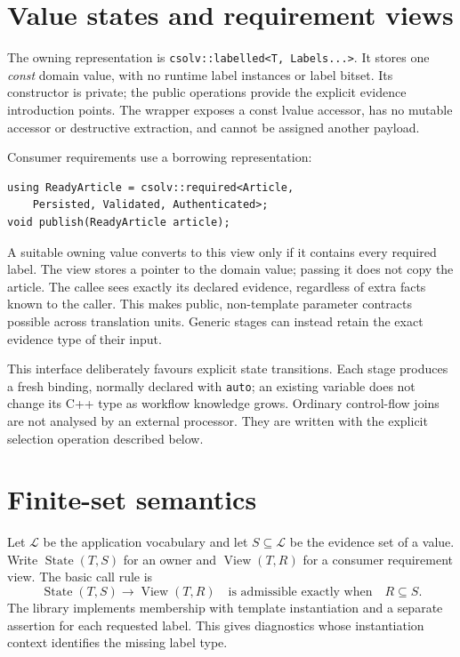 \documentclass[11pt]{article}
\begin{document}
\section{Value states and requirement views}
The owning representation is
\texttt{csolv::labelled<T, Labels...>}. It stores one \emph{const} domain value,
with no runtime label instances or label bitset. Its constructor is private;
the public operations provide the explicit evidence introduction points.
The wrapper exposes a const lvalue accessor, has no mutable accessor or
destructive extraction, and cannot be assigned another payload.

Consumer requirements use a borrowing representation:
\begin{lstlisting}
using ReadyArticle = csolv::required<Article,
    Persisted, Validated, Authenticated>;
void publish(ReadyArticle article);
\end{lstlisting}
A suitable owning value converts to this view only if it contains every
required label. The view stores a pointer to the domain value; passing it does
not copy the article. The callee sees exactly its declared evidence, regardless
of extra facts known to the caller. This makes public, non-template parameter
contracts possible across translation units. Generic stages can instead retain
the exact evidence type of their input.

This interface deliberately favours explicit state transitions. Each stage
produces a fresh binding, normally declared with \texttt{auto}; an existing
variable does not change its C++ type as workflow knowledge grows. Ordinary
control-flow joins are not analysed by an external processor. They are written
with the explicit selection operation described below.

\section{Finite-set semantics}
Let $\mathcal L$ be the application vocabulary and let $S\subseteq\mathcal L$
be the evidence set of a value. Write $\operatorname{State}(T,S)$ for an owner
and $\operatorname{View}(T,R)$ for a consumer requirement view. The basic call
rule is
\[
 \operatorname{State}(T,S)\longrightarrow\operatorname{View}(T,R)
 \quad\text{is admissible exactly when}\quad R\subseteq S.
\]
The library implements membership with template instantiation and a separate
assertion for each requested label. This gives diagnostics whose instantiation
context identifies the missing label type.
\end{document}
